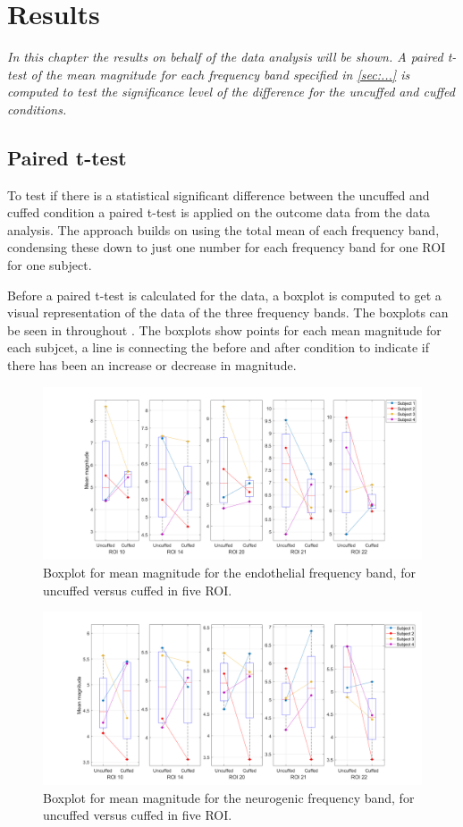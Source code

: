 \chapter{Results}
\textit{In this chapter the results on behalf of the data analysis will be shown. A paired t-test of the mean magnitude for each frequency band specified in \ref{sec:...} is computed to test the significance level of the difference for the uncuffed and cuffed conditions.}

\section{Paired t-test}
To test if there is a statistical significant difference between the uncuffed and cuffed condition a paired t-test is applied on the outcome data from the data analysis. The approach builds on using the total mean of each frequency band, condensing these down to just one number for each frequency band for one ROI for one subject. 

Before a paired t-test is calculated for the data, a boxplot is computed to get a visual representation of the data of the three frequency bands. The boxplots can be seen in  throughout . The boxplots show points for each mean magnitude for each subjcet, a line is connecting the before and after condition to indicate if there has been an increase or decrease in magnitude. 

\begin{figure}[H]
	\includegraphics[width=1\textwidth]{figures/boxplot_endo}
	\caption{Boxplot for mean magnitude for the endothelial frequency band, for uncuffed versus cuffed in five ROI.}
	\label{fig:boxEndo}
\end{figure}

\begin{figure}[H]
	\includegraphics[width=1\textwidth]{figures/boxplot_neuro}
	\caption{Boxplot for mean magnitude for the neurogenic frequency band, for uncuffed versus cuffed in five ROI.}
	\label{fig:boxNeuro}
\end{figure}

